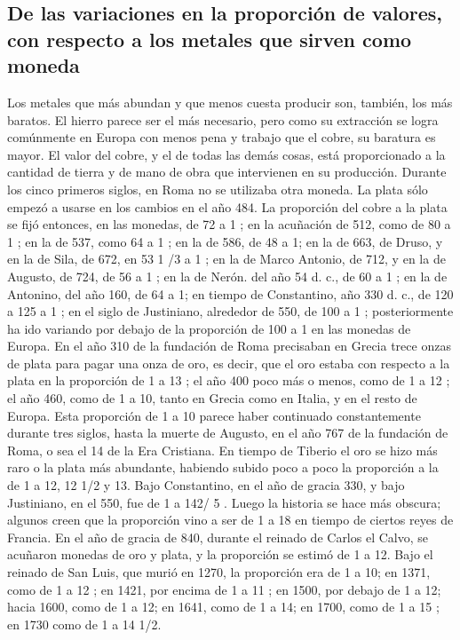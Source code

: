 \documentclass[10pt]{article}
\begin{document}
\begin{multicols}{1}
\section*{De las variaciones en la proporción de valores, con respecto a los metales que sirven como moneda}
Los metales que más abundan y que menos cuesta
producir son, también, los más baratos. El hierro parece ser el más necesario, pero como su extracción se logra comúnmente en Europa con menos pena y trabajo que el cobre, su baratura es mayor. El valor del cobre, y el de todas las demás cosas, está proporcionado a la cantidad de tierra y de mano de obra que intervienen en su producción. Durante los cinco primeros siglos, en Roma no se utilizaba otra moneda. La plata sólo empezó a usarse en los cambios en el año 484. La proporción del cobre a la plata se fijó entonces, en las monedas, de 72 a 1 ; en la acuñación de 512, como de 80 a 1 ; en la de 537, como 64 a 1 ; en la de 586, de 48 a 1; en la de 663, de Druso, y en la de Sila, de 672, en 53 1 /3 a 1 ; en la de Marco Antonio, de 712, y en la de Augusto, de 724, de 56 a 1 ; en la de Nerón. del año 54 d. c., de 60 a 1 ; en la de Antonino, del año 160, de 64 a 1; en tiempo de Constantino, año 330 d. c., de 120 a 125 a 1 ; en el siglo de Justiniano, alrededor de 550, de 100 a 1 ; posteriormente ha ido variando por debajo de la proporción de 100 a 1 en las monedas de Europa. En el año 310 de la fundación de Roma precisaban en Grecia trece onzas de plata para pagar una onza de oro, es decir, que el oro estaba con respecto a la plata en la proporción de 1 a 13 ; el año 400 poco más o menos, como de 1 a 12 ; el año 460, como de 1 a 10, tanto en Grecia como en Italia, y en el resto de Europa. Esta proporción de 1 a 10 parece haber continuado constantemente durante tres siglos, hasta la muerte de Augusto, en el año 767 de la fundación de Roma, o sea el 14 de la Era Cristiana. En tiempo de Tiberio el oro se hizo más raro o la plata más abundante, habiendo subido poco a poco la proporción a la de 1 a 12, 12 1/2 y 13. Bajo Constantino, en el año de gracia 330, y bajo Justiniano, en el 550, fue de 1 a 142/ 5 . Luego la historia se hace más obscura; algunos creen que la proporción vino a ser de 1 a 18 en tiempo de ciertos reyes de Francia. En el año de gracia de 840, durante el reinado de Carlos el Calvo, se acuñaron monedas de oro y plata, y la proporción se estimó de 1 a 12. Bajo el reinado de San Luis, que murió en 1270, la proporción era de 1 a 10; en 1371, como de 1 a 12 ; en 1421, por encima de 1 a 11 ; en 1500, por debajo de 1 a 12; hacia 1600, como de 1 a 12; en 1641, como de 1 a 14; en 1700, como de 1 a 15 ; en 1730 como de 1 a 14 1/2.\\

\end{multicols}
\end{document}
